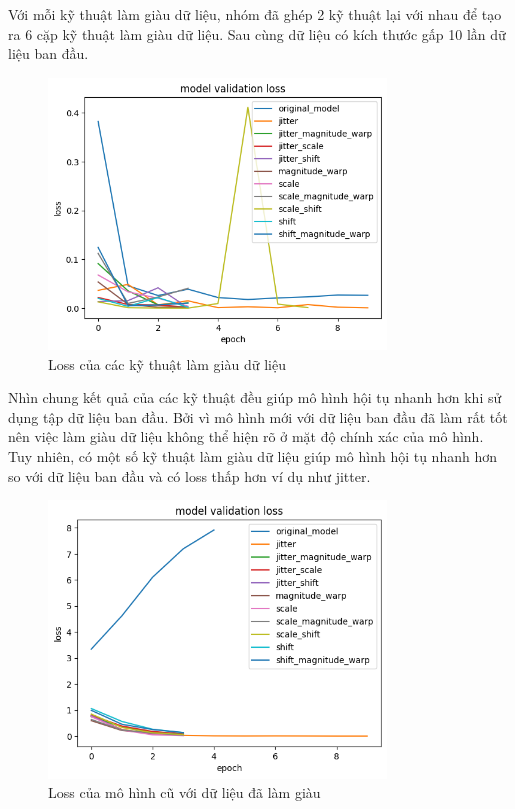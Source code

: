 Với mỗi kỹ thuật làm giàu dữ liệu, nhóm đã ghép 2 kỹ thuật lại với nhau để tạo ra 6 cặp kỹ thuật làm giàu dữ liệu. 
Sau cùng dữ liệu có kích thước gấp 10 lần dữ liệu ban đầu.

\begin{figure}[H]
    \centering
    \includegraphics[width=0.8\textwidth]{Images/Improvement results/data_augmentation_loss.png}
    \caption{Loss của các kỹ thuật làm giàu dữ liệu}
    \label{fig:data_augmentation_loss}
\end{figure}



Nhìn chung kết quả của các kỹ thuật đều giúp mô hình hội tụ nhanh hơn khi sử dụng tập dữ liệu ban đầu. Bởi vì mô hình mới với dữ liệu ban đầu đã làm rất tốt nên việc làm giàu dữ liệu không thể hiện rõ ở mặt độ chính xác của mô hình. Tuy nhiên, có một số kỹ thuật làm giàu dữ liệu giúp mô hình hội tụ nhanh hơn so với dữ liệu ban đầu và có loss thấp hơn ví dụ như jitter.

\begin{figure}[H]
    \centering
    \includegraphics[width=0.8\textwidth]{Images/Improvement results/old_data_augmentation_loss.png}
    \caption{Loss của mô hình cũ với dữ liệu đã làm giàu}
    \label{fig:old_data_augmentation_loss}
\end{figure}

